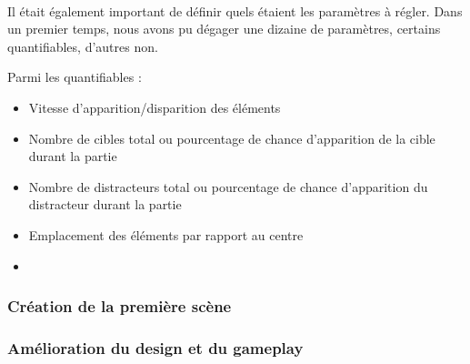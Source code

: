 \paragraph{}Il était également important de définir quels étaient les paramètres à régler. Dans un premier temps, nous avons pu dégager une dizaine de paramètres, certains
quantifiables, d'autres non.

Parmi les quantifiables :
\begin{itemize}
\item Vitesse d'apparition/disparition des éléments
\item Nombre de cibles total ou pourcentage de chance d'apparition de la cible durant la partie
\item Nombre de distracteurs total ou pourcentage de chance d'apparition du distracteur durant la partie
\item Emplacement des éléments par rapport au centre
\item 
\end{itemize}

\subsubsection{Création de la première scène}

\subsubsection{Amélioration du design et du gameplay}

\label{prototypage}